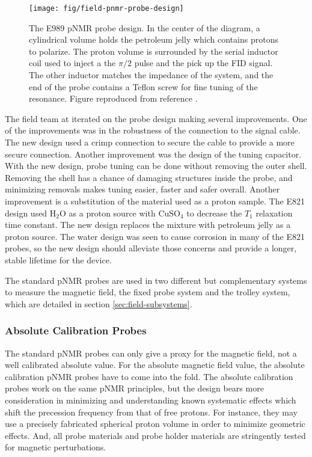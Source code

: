 \begin{figure}
\label{fig:field-pnmr-probe-design}
\centering
\texttt{[image: fig/field-pnmr-probe-design]}
\caption{
    The E989 pNMR probe design.  In the center of the diagram, a cylindrical volume holds the petroleum jelly which contains protons to polarize.  The proton volume is surrounded by the serial inductor coil used to inject a the $\pi/2$ pulse and the pick up the FID signal.  The other inductor matches the impedance of the system, and the end of the probe contains a Teflon screw for fine tuning of the resonance. Figure reproduced from reference \cite{fertl-priv}.
}
\end{figure}

The field team at \uw iterated on the probe design making several improvements.  One of the improvements was in the robustness of the connection to the signal cable.  The new design used a crimp connection to secure the cable to provide a more secure connection.  Another improvement was the design of the tuning capacitor.  With the new design, probe tuning can be done without removing the outer shell.  Removing the shell has a chance of damaging structures inside the probe, and minimizing removals makes tuning easier, faster and safer overall.  Another improvement is a substitution of the material used as a proton sample.  The E821 design used $\mathrm{H_2O}$ as a proton source with $\mathrm{CuSO_4}$ to decrease the $T_1$ relaxation time constant.  The new design replaces the mixture with petroleum jelly as a proton source.  The water design was seen to cause corrosion in many of the E821 probes, so the new design should alleviate those concerns and provide a longer, stable lifetime for the device.

The standard pNMR probes are used in two different but complementary systems to measure the magnetic field, the fixed probe system and the trolley system, which are detailed in section \ref{sec:field-subsystems}.

\subsubsection{Absolute Calibration Probes}

The standard pNMR probes can only give a proxy for the magnetic field, not a well calibrated absolute value.  For the absolute magnetic field value, the absolute calibration pNMR probes have to come into the fold.  The absolute calibration probes work on the same pNMR principles, but the design bears more consideration in minimizing and understanding known systematic effects which shift the precession frequency from that of free protons.  For instance, they may use a precisely fabricated spherical proton volume in order to minimize geometric effects.  And, all probe materials and probe holder materials are stringently tested for magnetic perturbations.


